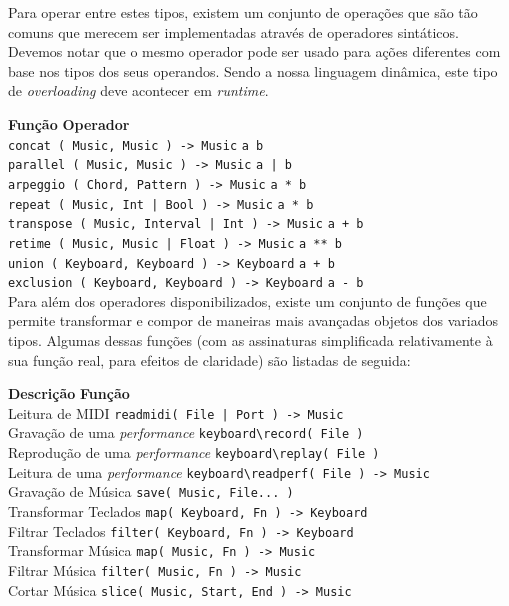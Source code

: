 Para operar entre estes tipos, existem um conjunto de operações que são tão comuns que merecem ser implementadas através de operadores sintáticos. Devemos notar que o mesmo operador pode ser usado para ações diferentes com base nos tipos dos seus operandos. Sendo a nossa linguagem dinâmica, este tipo de \textit{overloading} deve acontecer em \textit{runtime}.

\medskip

\noindent
\textbf{Função} \hfill \textbf{Operador} \ \ \\
\texttt{concat ( Music, Music ) -> Music} \dotfill \texttt{a b} \\
\texttt{parallel ( Music, Music ) -> Music} \dotfill \texttt{a | b} \\
\texttt{arpeggio ( Chord, Pattern ) -> Music} \dotfill \texttt{a * b} \\
\texttt{repeat ( Music, Int | Bool ) -> Music} \dotfill \texttt{a * b} \\ 
\texttt{transpose ( Music, Interval | Int ) -> Music} \dotfill \texttt{a + b} \\
\texttt{retime ( Music, Music | Float ) -> Music} \dotfill \texttt{a ** b} \\
\texttt{union ( Keyboard, Keyboard ) -> Keyboard} \dotfill \texttt{a + b} \\
\texttt{exclusion ( Keyboard, Keyboard ) -> Keyboard} \dotfill \texttt{a - b} \\

Para além dos operadores disponibilizados, existe um conjunto de funções que permite transformar e compor de maneiras mais avançadas objetos dos variados tipos. Algumas dessas funções (com as assinaturas simplificada relativamente à sua função real, para efeitos de claridade) são listadas de seguida:

\medskip

\noindent
\textbf{Descrição} \hfill \textbf{Função} \ \ \\
Leitura de MIDI \dotfill \texttt{readmidi( File | Port ) -> Music} \\
Gravação de uma \textit{performance} \dotfill \texttt{keyboard\textbackslash{}record( File )} \\
Reprodução de uma \textit{performance} \dotfill \texttt{keyboard\textbackslash{}replay( File )} \\
Leitura de uma \textit{performance} \dotfill \texttt{keyboard\textbackslash{}readperf( File ) -> Music} \\
Gravação de Música \dotfill \texttt{save( Music, File... )} \\
Transformar Teclados \dotfill \texttt{map( Keyboard, Fn ) -> Keyboard} \\
Filtrar Teclados \dotfill \texttt{filter( Keyboard, Fn ) -> Keyboard} \\
Transformar Música \dotfill \texttt{map( Music, Fn ) -> Music} \\
Filtrar Música \dotfill \texttt{filter( Music, Fn ) -> Music} \\
Cortar Música \dotfill \texttt{slice( Music, Start, End ) -> Music} \\
